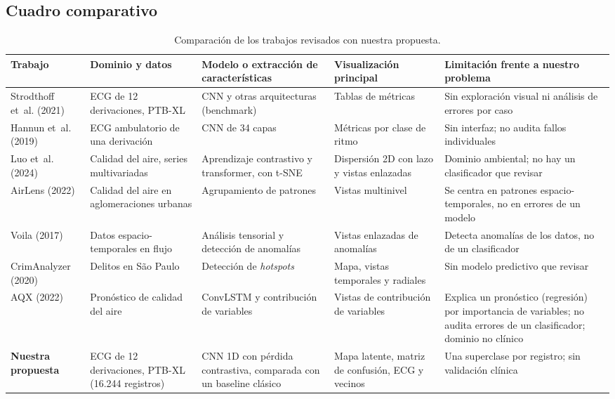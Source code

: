 \documentclass[conference]{IEEEtran}
\begin{document}
\subsection{Cuadro comparativo}
\begin{table}[t]
\centering
\caption{Comparación de los trabajos revisados con nuestra propuesta.}
\label{tab:comparativo}
\scriptsize
\renewcommand{\arraystretch}{1.15}
\begin{tabular}{L{2.4cm} L{3.2cm} L{3.6cm} L{3.3cm} L{4.5cm}}
\toprule
Trabajo & Dominio y datos & Modelo o extracción de características & Visualización principal & Limitación frente a nuestro problema \\
\midrule
Strodthoff et~al. (2021) \cite{strodthoff} & ECG de 12 derivaciones, PTB-XL & CNN y otras arquitecturas (benchmark) & Tablas de métricas & Sin exploración visual ni análisis de errores por caso \\
Hannun et~al. (2019) \cite{hannun} & ECG ambulatorio de una derivación & CNN de 34 capas & Métricas por clase de ritmo & Sin interfaz; no audita fallos individuales \\
Luo et~al. (2024) \cite{luo} & Calidad del aire, series multivariadas & Aprendizaje contrastivo y transformer, con t-SNE & Dispersión 2D con lazo y vistas enlazadas & Dominio ambiental; no hay un clasificador que revisar \\
AirLens (2022) \cite{qu} & Calidad del aire en aglomeraciones urbanas & Agrupamiento de patrones & Vistas multinivel & Se centra en patrones espacio-temporales, no en errores de un modelo \\
Voila (2017) \cite{cao} & Datos espacio-temporales en flujo & Análisis tensorial y detección de anomalías & Vistas enlazadas de anomalías & Detecta anomalías de los datos, no de un clasificador \\
CrimAnalyzer (2020) \cite{alvarenga} & Delitos en São Paulo & Detección de \emph{hotspots} & Mapa, vistas temporales y radiales & Sin modelo predictivo que revisar \\
AQX (2022) \cite{velumani} & Pronóstico de calidad del aire & ConvLSTM y contribución de variables & Vistas de contribución de variables & Explica un pronóstico (regresión) por importancia de variables; no audita errores de un clasificador; dominio no clínico \\
\midrule
\textbf{Nuestra propuesta} & ECG de 12 derivaciones, PTB-XL (16.244 registros) & CNN 1D con pérdida contrastiva, comparada con un baseline clásico & Mapa latente, matriz de confusión, ECG y vecinos & Una superclase por registro; sin validación clínica \\
\bottomrule
\end{tabular}
\end{table}
\end{document}
